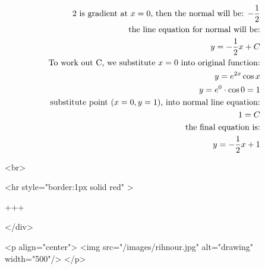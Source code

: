 $$
\begin{aligned}
\text{2 is gradient at $x=0$, then the normal will be: $-\frac{1}{2}$}\\
\text{the line equation for normal will be:}\\
y=-\frac{1}{2}x+C\\
\text{To work out C, we substitute $x=0$ into original function:}\\
y=e^{2x}\cos{x}\\
y=e^0\cdot\cos{0}=1\\
\text{substitute point ($x=0,\space y=1$), into normal line equation:}\\
1=C\\
\text{the final equation is:}\\
y=-\frac{1}{2} x +1\\
\end{aligned}
$$

<br>

<hr style="border:1px solid red" >

+++

</div>

<p align="center">
<img src="/images/rihnour.jpg" alt="drawing" width="500"/>
</p>
